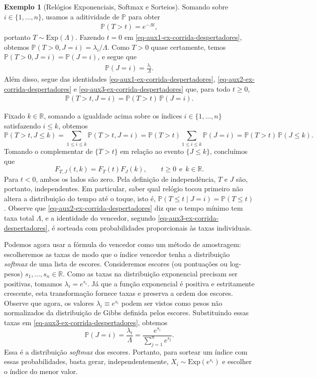 \documentclass[12pt,portuguese]{article}
\theoremstyle{definition}
\newtheorem{example}[example]{Exemplo}
\theoremstyle{plainexercise}
\theoremstyle{starredexercise}
\theoremstyle{definition}
\begin{document}
\begin{example}[Relógios Exponenciais, Softmax e Sorteios]
Somando sobre $i\in\{1,\ldots,n\}$, usamos a aditividade de $\mathbb{P}$ para obter
\begin{align}\label{eq-aux2-ex-corrida-despertadores} 
  \mathbb{P}(T>t)=e^{-\Lambda t},
\end{align}
portanto $T\sim\mathrm{Exp}(\Lambda)$. Fazendo $t=0$ em \eqref{eq-aux1-ex-corrida-despertadores},
obtemos $\mathbb{P}(T>0, J=i)=\lambda_i/\Lambda$. Como $T>0$ quase
certamente, temos $\mathbb{P}(T>0,J=i)=\mathbb{P}(J=i)$, e segue que
\begin{align}\label{eq-aux3-ex-corrida-despertadores}
\mathbb{P}(J=i)=\frac{\lambda_i}{\Lambda}.
\end{align}
Além disso, segue das identidades 
\eqref{eq-aux1-ex-corrida-despertadores}, 
\eqref{eq-aux2-ex-corrida-despertadores} 
e 
\eqref{eq-aux3-ex-corrida-despertadores}
que, para todo $t\geqslant0$,
\begin{align}\label{eq-aux4-ex-corrida-despertadores}
  \mathbb{P}(T>t,J=i)
  =\mathbb{P}(T>t)\,\mathbb{P}(J=i).
\end{align}

Fixado $k\in\mathbb{R}$, somando a igualdade acima sobre os índices $i\in\{1,\ldots,n\}$ satisfazendo
$i\leqslant k$, obtemos
\[
  \mathbb{P}(T>t,J\leqslant k)
  = \sum_{1\leqslant i\leqslant k} \mathbb{P}(T>t,J=i)
  = \mathbb{P}(T>t)\sum_{1\leqslant i\leqslant k}\mathbb{P}(J=i)
  = \mathbb{P}(T>t)\,\mathbb{P}(J\leqslant k).
\]
Tomando o complementar de $\{T>t\}$ em relação ao evento $\{J\leqslant k\}$, concluímos que
\[ 
  F_{T,J}(t,k)=F_T(t)F_J(k), \qquad t\geqslant 0 \ \  \text{e}\ \  k\in\mathbb{R}.
\] 
Para $t<0$, ambos os lados são zero.
Pela definição de independência, $T$ e $J$ são, portanto, independentes.
Em particular, saber qual relógio tocou primeiro
não altera a distribuição do tempo até o toque, 
isto é, $\mathbb{P}(T\leqslant t\mid J=i) =\mathbb{P}(T\leqslant t)$.
Observe que \eqref{eq-aux2-ex-corrida-despertadores} diz que o tempo mínimo tem taxa total
$\Lambda$, e a identidade do vencedor, segundo \eqref{eq-aux3-ex-corrida-despertadores}, 
é sorteada com probabilidades proporcionais às taxas individuais.

\bigskip 

Podemos agora usar a fórmula do vencedor como um método de amostragem:
escolheremos as taxas de modo que o índice vencedor tenha a distribuição
\emph{softmax} de uma lista de escores. Consideremos escores (ou pontuações ou log-pesos) 
$s_1,\ldots,s_n\in\mathbb{R}$. Como as taxas na distribuição exponencial precisam ser positivas, 
tomamos $\lambda_i=e^{s_i}$. Já que a função exponencial é positiva e estritamente crescente, esta transformação 
fornece taxas e preserva a ordem dos escores. Observe que agora, os valores
$\lambda_i \equiv e^{s_i}$ podem ser vistos como  pesos não normalizados 
da distribuição de Gibbs definida pelos escores. 
Substituindo essas taxas em \eqref{eq-aux3-ex-corrida-despertadores},
obtemos
\[
  \mathbb{P}(J=i)
  =\frac{\lambda_i}{\Lambda}
  =\frac{e^{s_i}}{\sum_{j=1}^n e^{s_j}}.
\]
Essa é a distribuição \emph{softmax} dos escores. Portanto, para sortear um
índice com essas probabilidades, basta gerar, independentemente,
$X_i\sim\mathrm{Exp}(e^{s_i})$ e escolher o índice do menor valor.


\end{example}
\end{document}
